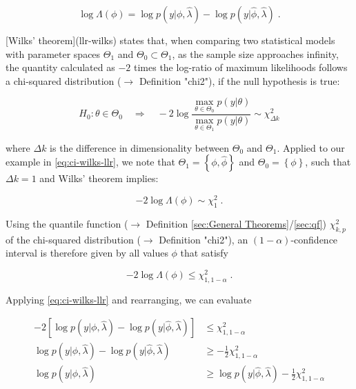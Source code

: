 \documentclass[a4paper,12pt]{book}
\begin{document}
\begin{equation} \label{eq:ci-wilks-llr}
\log \Lambda(\phi) = \log p(y|\phi,\hat{\lambda}) - \log p(y|\hat{\phi},\hat{\lambda}) \; .
\end{equation}

[Wilks' theorem](llr-wilks) states that, when comparing two statistical models with parameter spaces $\Theta_1$ and $\Theta_0 \subset \Theta_1$, as the sample size approaches infinity, the quantity calculated as $-2$ times the log-ratio of maximum likelihoods follows a chi-squared distribution ($\rightarrow$ Definition "chi2"), if the null hypothesis is true:

\begin{equation} \label{eq:ci-wilks-wilks}
H_0: \theta \in \Theta_0 \quad \Rightarrow \quad -2 \log \frac{\operatorname*{max}_{\theta \in \Theta_0} p(y|\theta)}{\operatorname*{max}_{\theta \in \Theta_1} p(y|\theta)} \sim \chi^2_{\Delta k}
\end{equation}

where $\Delta k$ is the difference in dimensionality between $\Theta_0$ and $\Theta_1$. Applied to our example in \eqref{eq:ci-wilks-llr}, we note that $\Theta_1 = \left\lbrace \phi, \hat{\phi} \right\rbrace$ and $\Theta_0 = \left\lbrace \phi \right\rbrace$, such that $\Delta k = 1$ and Wilks' theorem implies:

\begin{equation} \label{eq:ci-wilks-llr-wilks}
-2 \log \Lambda(\phi) \sim  \chi^2_1 \; .
\end{equation}

Using the quantile function ($\rightarrow$ Definition \ref{sec:General Theorems}/\ref{sec:qf}) $\chi^2_{k,p}$ of the chi-squared distribution ($\rightarrow$ Definition "chi2"), an $(1-\alpha)$-confidence interval is therefore given by all values $\phi$ that satisfy

\begin{equation} \label{eq:ci-wilks-llr-chi2}
-2 \log \Lambda(\phi) \leq \chi^2_{1,1-\alpha} \; .
\end{equation}

Applying \eqref{eq:ci-wilks-llr} and rearranging, we can evaluate

\begin{equation} \label{eq:ci-wilks-llr-chi2-dev}
\begin{split}
-2 \left[ \log p(y|\phi,\hat{\lambda}) - \log p(y|\hat{\phi},\hat{\lambda}) \right] &\leq \chi^2_{1,1-\alpha} \\
\log p(y|\phi,\hat{\lambda}) - \log p(y|\hat{\phi},\hat{\lambda}) &\geq -\frac{1}{2} \chi^2_{1,1-\alpha} \\
\log p(y|\phi,\hat{\lambda}) &\geq \log p(y|\hat{\phi},\hat{\lambda}) - \frac{1}{2} \chi^2_{1,1-\alpha}
\end{split}
\end{equation}
\end{document}
